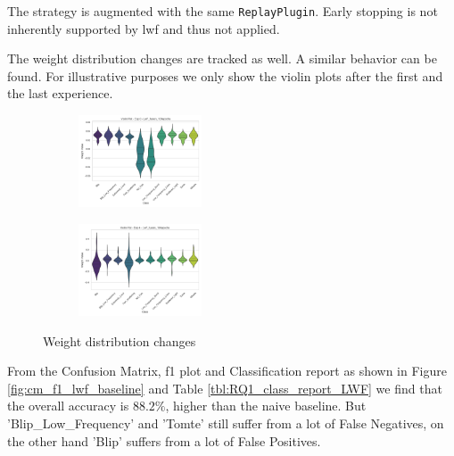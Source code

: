 The strategy is augmented with the same \verb|ReplayPlugin|. 
Early stopping is not inherently supported by \acrshort{lwf} and thus not applied. 

The weight distribution changes are tracked as well. A similar behavior can be found. For illustrative purposes we only show the violin plots after the first and the last experience. 

\begin{figure}[ht]
\centering
\begin{subfigure}
  \centering
  \includegraphics[width=0.4\textwidth]{Grad Assignment/Images/LwF_fusion_100epochs_exp_0.png}  
  \label{fig:lwf_violin_exp_0}
\end{subfigure}
\begin{subfigure}
  \centering
  \includegraphics[width=0.4\textwidth]{Grad Assignment/Images/LwF_fusion_100epochs_exp_4.png}  
  \label{fig:lwf_violin_exp_4}
\end{subfigure}
\caption{Weight distribution changes}
\label{fig:lwf_weight_distribution}
\end{figure}

From the Confusion Matrix, f1 plot and Classification report as shown in Figure \ref{fig:cm_f1_lwf_baseline} and Table \ref{tbl:RQ1_class_report_LWF} we find that the overall accuracy is $88.2 \%$, higher than the naive baseline. But 'Blip\_Low\_Frequency' and 'Tomte' still suffer from a lot of False Negatives, on the other hand 'Blip' suffers from a lot of False Positives. 

